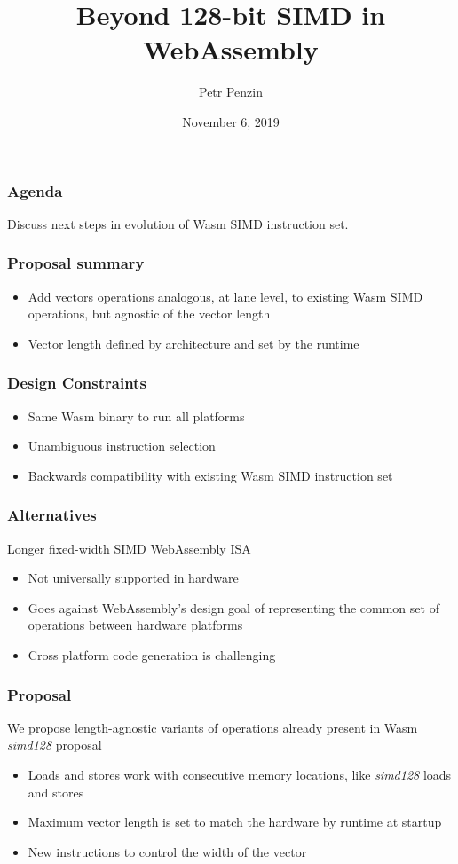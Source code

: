 \documentclass[t,aspectratio=169, xcolor={table}]{beamer}
\title{Beyond 128-bit SIMD in WebAssembly}
\author{Petr Penzin}
\institute{Intel Corporation}
\date{November 6, 2019}
\begin{document}
\begin{frame}
  \titlepage
\end{frame}
\begin{frame}
\frametitle{Agenda}
Discuss next steps in evolution of Wasm SIMD instruction set.
\end{frame}
\begin{frame}
\frametitle{Proposal summary}
  \begin{itemize}
  \item Add vectors operations analogous, at lane level, to existing Wasm SIMD operations, but agnostic of the vector length
  \item Vector length defined by architecture and set by the runtime
  \end{itemize}
\end{frame}
\begin{frame}
\frametitle{Design Constraints}
  \begin{itemize}
  \item Same Wasm binary to run all platforms
  \item Unambiguous instruction selection
  \item Backwards compatibility with existing Wasm SIMD instruction set %
  \end{itemize}
\end{frame}
\begin{frame}
\frametitle{Alternatives}
  Longer fixed-width SIMD WebAssembly ISA
  \begin{itemize}
  \item Not universally supported in hardware
  \item Goes against WebAssembly's design goal of representing the common set of operations between hardware platforms
  \item Cross platform code generation is challenging
  \end{itemize}
\end{frame}
\begin{frame}
\frametitle{Proposal}
  We propose length-agnostic variants of operations already present in Wasm \textit{simd128} proposal
  \begin{itemize}
  \item Loads and stores work with consecutive memory locations, like \textit{simd128} loads and stores
  \item Maximum vector length is set to match the hardware by runtime at startup
  \item New instructions to control the width of the vector
  \end{itemize}
\end{frame}
\end{document}

